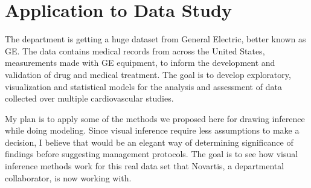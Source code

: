 
\chapter{Application to Data Study} \label{ch:application} 

The department is getting a huge dataset from General Electric, better known as GE. The data contains medical records from across the United States, measurements made with GE equipment, to inform the development and validation of drug and medical treatment. The goal is to develop exploratory, visualization and statistical models for the analysis and assessment of data collected over multiple cardiovascular studies. 

My plan is to apply some of the methods we proposed here for drawing inference while doing modeling. Since visual inference require less assumptions to make a decision, I believe that would be an elegant way of determining significance of findings before suggesting management protocols. The goal is to see how visual inference methods work for this real data set that Novartis, a departmental collaborator, is now working with. 






